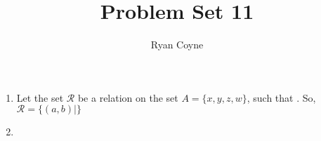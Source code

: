 \documentclass[12pt]{article}
\begin{document}
    \title{Problem Set 11}
    \author{Ryan Coyne}
    \maketitle

    \begin{enumerate}
        \item Let the set \(\mathcal{R}\) be a relation on the set \(A=\{x, y, z, w\}\), such that . So, \(\mathcal{R} = \{(a,b)|\}\)
        \item 
    \end{enumerate}
\end{document}
